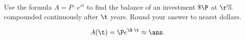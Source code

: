 





Use the formula $\displaystyle A=P\cdot e^{rt}$ to find the balance of an investment $\$\P$  at  $\r\%$ compounded continuously after $\t$ years. Round your answer to nearst dollars.

\begin{solution}
\[A(\t)=\P e^{\R \cdot \t}\approx \ans.\]
\end{solution}
